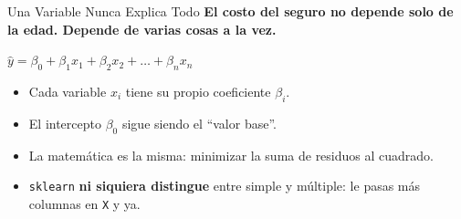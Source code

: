 \documentclass[aspectratio=169, 11pt]{beamer}
\begin{document}
\begin{frame}[shrink=5]{Una Variable Nunca Explica Todo}
  \vspace{-4pt}
  {\footnotesize\color{arcaDark}\bfseries
    El costo del seguro no depende solo de la edad. Depende de
    \textbf{varias cosas a la vez}.}

  \vspace{8pt}
  \begin{center}
    \begin{tcolorbox}[colback=arcaGray, colframe=arcaRed, boxrule=1pt,
                      arc=4pt, width=0.85\textwidth]
    \centering
    \large
    $\hat{y} = \beta_0 + \beta_1 x_1 + \beta_2 x_2 + \ldots + \beta_n x_n$
    \end{tcolorbox}
  \end{center}

  \vspace{6pt}
  {\footnotesize
  \begin{itemize}\setlength{\itemsep}{5pt}
    \item[{\color{arcaRed}\faArrowRight}]
      Cada variable $x_i$ tiene su propio coeficiente $\beta_i$.
    \item[{\color{arcaRed}\faArrowRight}]
      El intercepto $\beta_0$ sigue siendo el ``valor base''.
    \item[{\color{arcaRed}\faArrowRight}]
      La matemática es la misma: minimizar la suma de residuos al cuadrado.
    \item[{\color{arcaRed}\faArrowRight}]
      \texttt{sklearn} \textbf{ni siquiera distingue} entre simple y múltiple:
      le pasas más columnas en \texttt{X} y ya.
  \end{itemize}
  }
\end{frame}
\end{document}
